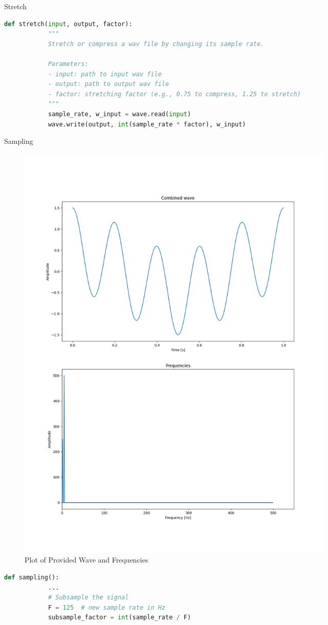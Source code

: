 \begin{hwkProblem}{6.4}{Stretch}
	\solution

	\begin{lstlisting}[language=python]
		def stretch(input, output, factor):
			"""
			Stretch or compress a wav file by changing its sample rate.

			Parameters:
			- input: path to input wav file
			- output: path to output wav file
			- factor: stretching factor (e.g., 0.75 to compress, 1.25 to stretch)
			"""
			sample_rate, w_input = wave.read(input)
			wave.write(output, int(sample_rate * factor), w_input)
	\end{lstlisting}
\end{hwkProblem}

\begin{hwkProblem}{6.5}{Sampling}
	\solution

	\solpart

	\begin{figure}[ht!]
	  \centering
	  \includegraphics[width=0.75\textwidth]{./6.5.1.png}
	  \caption{Plot of Provided Wave and Frequencies}
	\end{figure}

	\newpage
	\solpart

	\begin{lstlisting}[language=python]
		def sampling():
			...
			# Subsample the signal
			F = 125  # new sample rate in Hz
			subsample_factor = int(sample_rate / F)


\end{lstlisting}
\end{hwkProblem}
